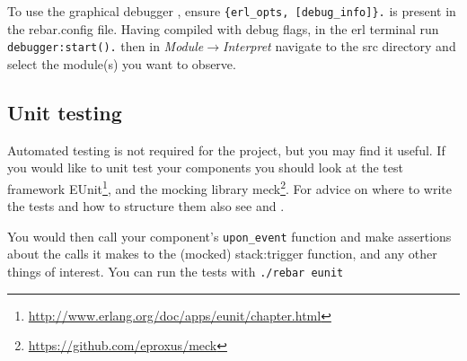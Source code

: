\documentclass[a4paper]{article}
\begin{document}
To use the graphical debugger \cite{manual_debugger}, ensure
\verb!{erl_opts, [debug_info]}.! is present in the rebar.config file.
Having compiled with debug flags, in the erl terminal run \verb!debugger:start().!
then in \emph{Module$\rightarrow$Interpret} navigate to the src directory and select the
module(s) you want to observe.


\subsection{Unit testing} %
\label{sub:unit_testing}

Automated testing is not required for the project, but you may find it useful.
If you would like to unit test your components you should look at the test
framework
EUnit\footnote{\url{http://www.erlang.org/doc/apps/eunit/chapter.html}}, and
the mocking library meck\footnote{\url{https://github.com/eproxus/meck}}. For
advice on where to write the tests and how to structure them also see
\cite{mochimedia_test} and \cite{so_eunit_q}.

You would then call your component's \verb!upon_event! function and make
assertions about the calls it makes to the (mocked) stack:trigger function,
and any other things of interest. You can run the tests with
\verb!./rebar eunit!


\end{document}
